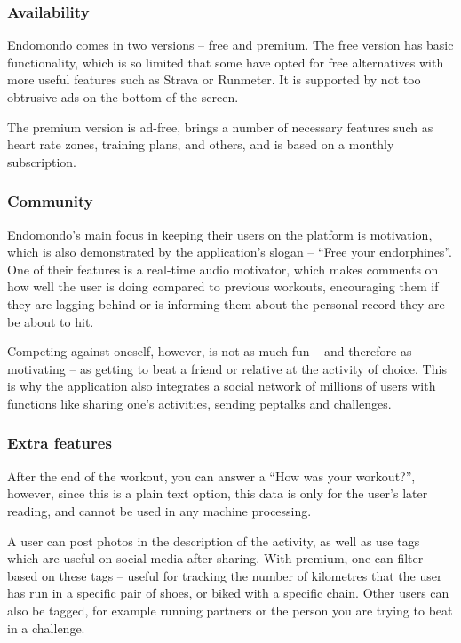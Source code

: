 \subsubsection*{Availability}
Endomondo comes in two versions -- free and premium.
The free version has basic functionality, which is so limited that some have opted for free alternatives with more useful features such as Strava or Runmeter.\cite{endomondo-review}
It is supported by not too obtrusive ads on the bottom of the screen.

The premium version is ad-free, brings a number of necessary features such as heart rate zones, training plans, and others, and is based on a monthly subscription.

\subsubsection*{Community}
Endomondo's main focus in keeping their users on the platform is motivation, which is also demonstrated by the application's slogan -- ``Free your endorphines''.
One of their features is a real-time audio motivator, which makes comments on how well the user is doing compared to previous workouts,
encouraging them if they are lagging behind or is informing them about the personal record they are be about to hit.

Competing against oneself, however, is not as much fun -- and therefore as motivating -- as getting to beat a friend or relative at the activity of choice.
This is why the application also integrates a social network of millions of users with functions like sharing one's activities, sending peptalks and challenges.
\subsubsection*{Extra features}
After the end of the workout, you can answer a ``How was your workout?'', however, since this is a plain text option, this data is only for the user's later reading, and cannot be used in any machine processing.

A user can post photos in the description of the activity, as well as use tags which are useful on social media after sharing.
With premium, one can filter based on these tags -- useful for tracking the number of kilometres that the user has run in a specific pair of shoes, or biked with a specific chain.
Other users can also be tagged, for example running partners or the person you are trying to beat in a challenge.

